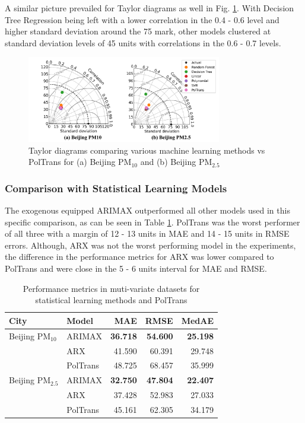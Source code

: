 \documentclass[10pt,journal]{IEEEtran}
\begin{document}
A similar picture prevailed for Taylor diagrams as well in Fig. \ref{fig:m_ml-taylor}. With Decision Tree Regression being left with a lower correlation in the 0.4 - 0.6 level and higher standard deviation around the 75 mark, other models clustered at standard deviation levels of 45 units with correlations in the 0.6 - 0.7 levels.

\begin{figure}[h]
\centering
\includegraphics[width=8.5cm]{../paper_figures/merged_taylor_m_ml.png}
\caption{Taylor diagrams comparing various machine learning methods vs {PolTrans}  for (a) Beijing PM${_{10}}$ and (b) Beijing PM${_{2.5}}$}
\label{fig:m_ml-taylor}
\end{figure}

\subsubsection{Comparison with Statistical Learning Models}

The exogenous equipped ARIMAX outperformed all other models used in this specific comparison, as can be seen in Table \ref{tbl:m_stat-performance}. {PolTrans} was the worst performer of all three with a margin of 12 - 13 units in MAE and 14 - 15 units in RMSE errors. Although, ARX was not the worst performing model in the experiments, the difference in the performance metrics for ARX was lower compared to PolTrans and were close in the 5 - 6 units interval for MAE and RMSE.  

\begin{table}[h]
\small
\centering
\tabcolsep=0.16cm
\caption{Performance metrics in muti-variate datasets for statistical learning methods and PolTrans}
\label{tbl:m_stat-performance}
\begin{tabular}{llrrr}
\toprule
City & Model &   MAE &    RMSE &   MedAE \\
\midrule
Beijing PM${_{10}}$ & ARIMAX &  \textbf{36.718} &  \textbf{54.600} &  \textbf{25.198} \\
              & ARX &  41.590 &  60.391 &  29.748 \\
              & PolTrans &  48.725 &  68.457 &  35.999 \\
Beijing PM${_{2.5}}$ & ARIMAX &  \textbf{32.750} &  \textbf{47.804} &  \textbf{22.407} \\
              & ARX &  37.428 &  52.983 &  27.033 \\
              & PolTrans &  45.161 &  62.305 &  34.179 \\
\bottomrule
\end{tabular}
\end{table}
\end{document}
